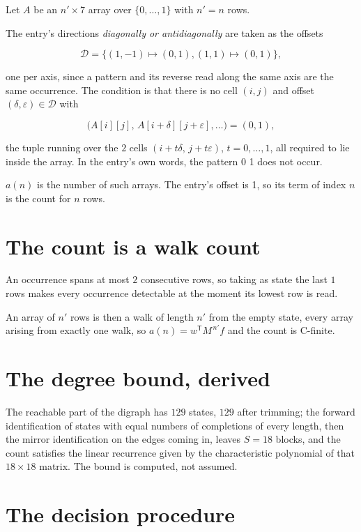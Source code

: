 \documentclass[11pt]{article}
\theoremstyle{definition}
\begin{document}
Let $A$ be an $n' \times 7$ array over $\{0,\dots,1\}$ with $n' = n$ rows.

The entry's directions {\itshape diagonally or antidiagonally} are taken as the offsets

\[\mathcal{D} = \{(1,-1)\mapsto(0,1), (1,1)\mapsto(0,1)\},\]

one per axis, since a pattern and its reverse read along the same axis are the same occurrence. The condition is that there is no cell $(i,j)$ and offset $(\delta,\varepsilon)\in\mathcal{D}$ with

\[\bigl(A[i][j],\,A[i{+}\delta][j{+}\varepsilon],\dots\bigr) = (0, 1),\]

the tuple running over the $2$ cells $(i+t\delta,\,j+t\varepsilon)$, $t = 0,\dots,1$, all required to lie inside the array. In the entry's own words, the pattern 0 1 does not occur.

$a(n)$ is the number of such arrays. The entry's offset is 1, so its term of index $n$ is the count for $n$ rows.

\section{The count is a walk count}

An occurrence spans at most $2$ consecutive rows, so taking as state the last $1$ rows makes every occurrence detectable at the moment its lowest row is read.

An array of $n'$ rows is then a walk of length $n'$ from the empty state, every array arising from exactly one walk, so $a(n) = w^{\mathsf T}M^{\,n'}f$ and the count is C-finite.

\section{The degree bound, derived}

The reachable part of the digraph has $129$ states, $129$ after trimming; the forward identification of states with equal numbers of completions of every length, then the mirror identification on the edges coming in, leaves $S = 18$ blocks, and the count satisfies the linear recurrence given by the characteristic polynomial of that $18\times18$ matrix. The bound is computed, not assumed.

\section{The decision procedure}
\end{document}
